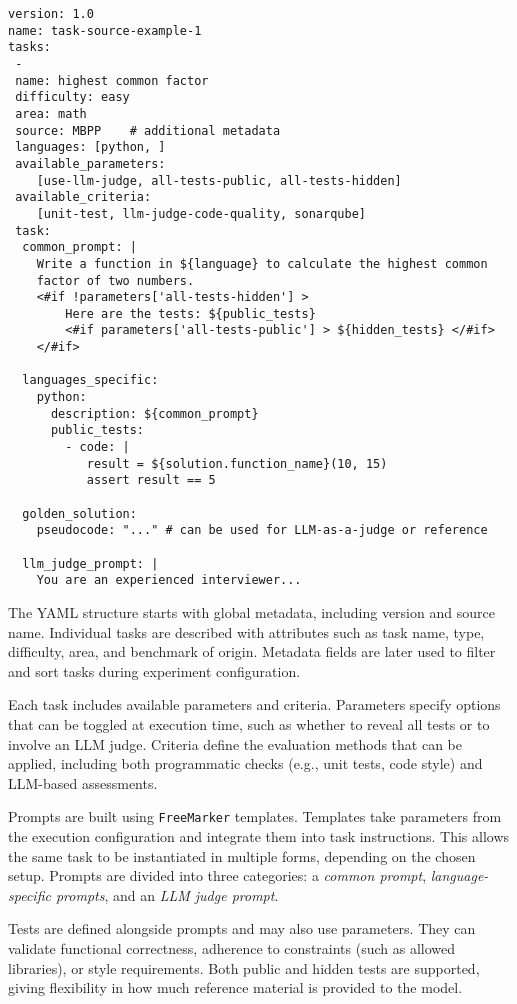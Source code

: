 \begin{verbatim}
version: 1.0
name: task-source-example-1
tasks:
 -
 name: highest common factor
 difficulty: easy
 area: math
 source: MBPP    # additional metadata
 languages: [python, ]
 available_parameters:
    [use-llm-judge, all-tests-public, all-tests-hidden]
 available_criteria:
    [unit-test, llm-judge-code-quality, sonarqube]
 task:
  common_prompt: |
    Write a function in ${language} to calculate the highest common
    factor of two numbers.
    <#if !parameters['all-tests-hidden'] >
        Here are the tests: ${public_tests}
        <#if parameters['all-tests-public'] > ${hidden_tests} </#if>
    </#if>

  languages_specific:
    python:
      description: ${common_prompt}
      public_tests:
        - code: |
           result = ${solution.function_name}(10, 15)
           assert result == 5

  golden_solution:
    pseudocode: "..." # can be used for LLM-as-a-judge or reference

  llm_judge_prompt: |
    You are an experienced interviewer...
\end{verbatim}

The YAML structure starts with global metadata, including version and source name.
Individual tasks are described with attributes such as task name, type, difficulty, area, and benchmark of origin.
Metadata fields are later used to filter and sort tasks during experiment configuration.

Each task includes available parameters and criteria.
Parameters specify options that can be toggled at execution time, such as whether to reveal all tests or to involve an LLM judge.
Criteria define the evaluation methods that can be applied, including both programmatic checks (e.g., unit tests, code style) and LLM-based assessments.

Prompts are built using \texttt{FreeMarker} templates. Templates take parameters from the execution configuration and integrate them into task instructions.
This allows the same task to be instantiated in multiple forms, depending on the chosen setup.
Prompts are divided into three categories: a \emph{common prompt}, \emph{language-specific prompts}, and an \emph{LLM judge prompt}.

Tests are defined alongside prompts and may also use parameters.
They can validate functional correctness, adherence to constraints (such as allowed libraries), or style requirements.
Both public and hidden tests are supported, giving flexibility in how much reference material is provided to the model.

